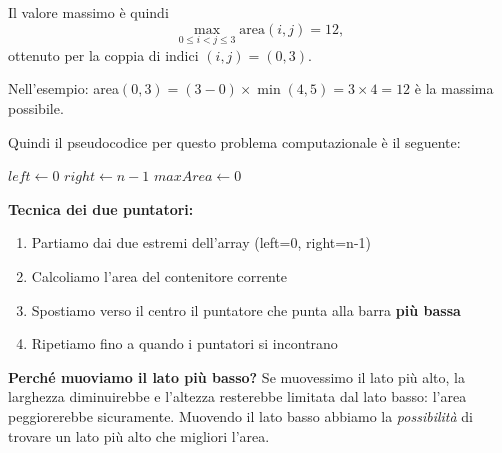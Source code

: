 \documentclass[a4paper, 11pt]{article}
\theoremstyle{definition}
\theoremstyle{remark}
\theoremstyle{remark}
\begin{document}
	Il valore massimo è quindi
	\[
	\max_{0 \le i < j \le 3} \mathrm{area}(i,j) = 12,
	\]
	ottenuto per la coppia di indici $(i,j) = (0,3)$.
	
	\begin{softnote}
		Nell'esempio: area$(0,3) = (3-0) \times \min(4,5) = 3 \times 4 = 12$ è la massima possibile.
	\end{softnote}
	
	Quindi il pseudocodice per questo problema computazionale è il seguente:
	
	\begin{algorithm}[H]
		\caption{Container With Most Water}
		\label{alg:container-most-water}
		
		
		$left \gets 0$
		$right \gets n - 1$
		$maxArea \gets 0$
		
	\end{algorithm}
	
	\begin{softnote}
		\textbf{Tecnica dei due puntatori:}
		
		\begin{enumerate}
			\item Partiamo dai due estremi dell'array (left=0, right=n-1)
			\item Calcoliamo l'area del contenitore corrente
			\item Spostiamo verso il centro il puntatore che punta alla barra \textbf{più bassa}
			\item Ripetiamo fino a quando i puntatori si incontrano
		\end{enumerate}
		
		\textbf{Perché muoviamo il lato più basso?} Se muovessimo il lato più alto, la larghezza diminuirebbe e l'altezza resterebbe limitata dal lato basso: l'area peggiorerebbe sicuramente. Muovendo il lato basso abbiamo la \textit{possibilità} di trovare un lato più alto che migliori l'area.
	\end{softnote}
	
\end{document}

